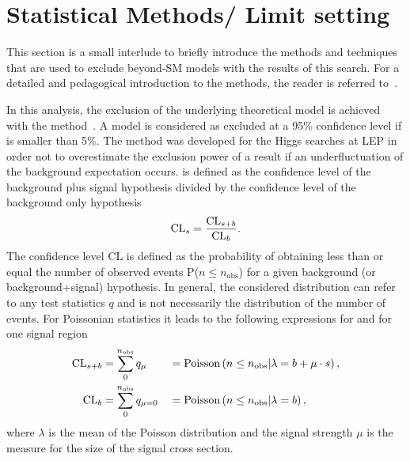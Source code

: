 \section{Statistical Methods/ Limit setting}
This section is a small interlude to briefly introduce the methods and techniques that are used to exclude beyond-SM models with the results of this search.
For a detailed and pedagogical introduction to the methods, the reader is referred to~\cite{bib:Ott_Thesis}.

In this analysis, the exclusion of the underlying theoretical model is achieved with the \CLs method~\cite{bib:CLS_1999,bib:CLS_2000,bib:CLS_2002}.
A model is considered as excluded at a 95\% confidence level if \CLs is smaller than 5\%.
The \CLs method was developed for the Higgs searches at LEP in order not to overestimate the exclusion power of a result if an  underfluctuation of the background expectation occurs.
\CLs is defined as the confidence level of the background plus signal hypothesis divided by the confidence level of the background only hypothesis
\begin{equation}
\text{CL}_{s} = \frac{\text{CL}_{s+b}}{\text{CL}_{b}}.
\end{equation}
The confidence level CL is defined as the probability of obtaining less than or equal the number of observed events P($n\leq n_{\text{obs}}$) for a given background (or background+signal) hypothesis.
In general, the considered distribution can refer to any test statistics $q$ and is not necessarily the distribution of the number of events.
For Poissonian statistics it leads to the following expressions for \CLsb and \CLb for one signal region
\begin{equation}
\label{eq:CLsb_CLb}
\begin{aligned}
\text{CL}_{s+b} &= \sum\limits_{0}^{n_{\text{obs}}} q_{\mu}    &&= \text{Poisson}\left( n\leq n_{\text{obs}} |\lambda = b+\mu\cdot s   \right),\\
\text{CL}_{b}  &= \sum\limits_{0}^{n_{\text{obs}}} q_{\mu = 0} &&= \text{Poisson}\left( n \leq n_{\text{obs}} |\lambda = b   \right),\
\end{aligned}
\end{equation}
where $\lambda$ is the mean of the Poisson distribution and the signal strength $\mu$ is the measure for the size of the signal cross section.

